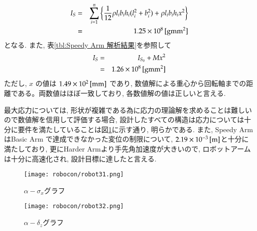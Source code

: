 \documentclass[10pt,b5paper,papersize,dvipdfmx]{jsbook}
\begin{document}
\begin{eqnarray}
  I_S&=&\sum_{i=1}^{n} \left\{ \frac{1}{12} \rho l_ib_ih_i(l_i^2+b_i^2)+\rho l_ib_ih_ix^2 \right\}\\
  &=&1.25\times10^8\tani*{g mm^2}
\end{eqnarray}
となる. また, 表\ref{tbl:Speedy Arm 解析結果}を参照して
\begin{eqnarray}
  I_S&=&I_{S_0}+Mx^2\\
  &=&1.26\times10^8\tani*{g mm^2}
\end{eqnarray}
ただし, $x$ の値は $1.49\times10^2 \tani*{mm}$ であり, 数値解による重心から回転軸までの距離である。両数値はほぼ一致しており, 各数値解の値は正しいと言える.\par
最大応力については, 形状が複雑である為に応力の理論解を求めることは難しいので数値解を信用して評価する場合, 設計したすべての構造は応力については十分に要件を満たしていることは図\ref{fig:alpha-sigma_xグラフ}に示す通り, 明らかである. また, Speedy ArmはBasic Arm で達成できなかった変位の制限について, $2.19\times10^{-3} \tani*{m}$と十分に満たしており, 更にHarder Armより手先角加速度が大きいので, ロボットアームは十分に高速化され, 設計目標に達したと言える.

\begin{figure}[H]
  \centering
  \texttt{[image: robocon/robot31.png]}
  \caption{$\alpha-\sigma_x$グラフ}
  \label{fig:alpha-sigma_xグラフ}
\end{figure}
\begin{figure}[H]
  \centering
  \texttt{[image: robocon/robot32.png]}
  \caption{$\alpha-\delta_z$グラフ}
  \label{fig:alpha-delta_zグラフ}
\end{figure}
\end{document}
